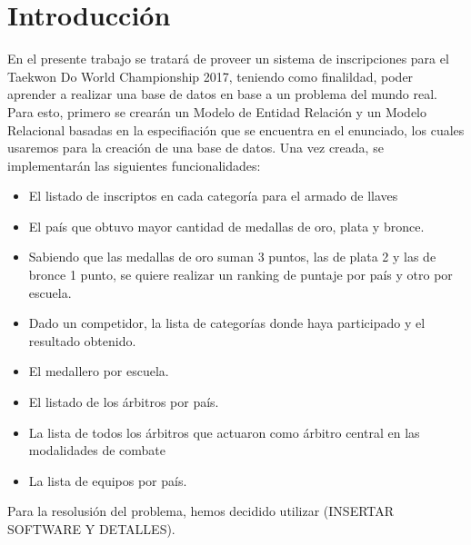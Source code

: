 \section{Introducción}
En el presente trabajo se tratará de proveer un sistema de inscripciones para el Taekwon Do World Championship 2017, teniendo como finalildad, poder aprender a realizar una base de datos en base a un problema del mundo real. Para esto, primero se crearán un Modelo de Entidad Relación y un Modelo Relacional basadas en la especifiación que se encuentra en el enunciado, los cuales usaremos para la creación de una base de datos. Una vez creada, se implementarán las siguientes funcionalidades:

\begin{itemize}
	\item El listado de inscriptos en cada categoría para el armado de llaves
	\item El país que obtuvo mayor cantidad de medallas de oro, plata y bronce.
	\item Sabiendo que las medallas de oro suman 3 puntos, las de plata 2 y las de bronce 1
punto, se quiere realizar un ranking de puntaje por país y otro por escuela.
	\item Dado un competidor, la lista de categorías donde haya participado y el resultado
obtenido.
	\item El medallero por escuela.
	\item El listado de los árbitros por país.
	\item La lista de todos los árbitros que actuaron como árbitro central en las modalidades
de combate
	\item La lista de equipos por país.
\end{itemize}

Para la resolusión del problema, hemos decidido utilizar (INSERTAR SOFTWARE Y DETALLES).